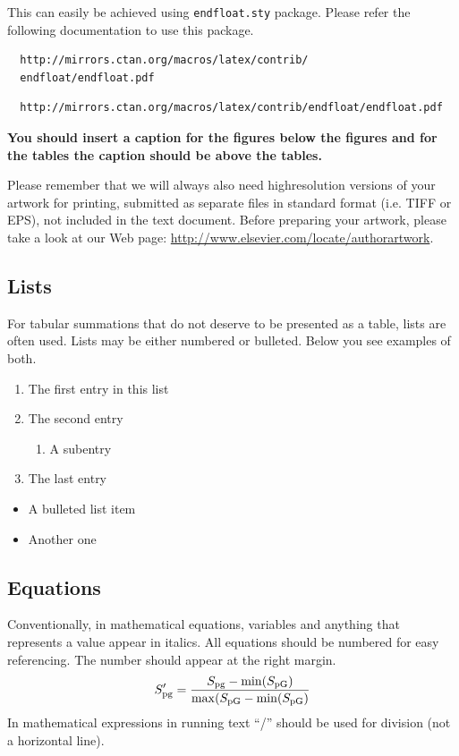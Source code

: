 \documentclass[times,twocolumn,final,authoryear]{elsarticle}
\begin{document}
This can easily be achieved using \verb+endfloat.sty+ package. Please
refer the following documentation to use this package.
\makeatletter
\if@twocolumn
\begin{verbatim}
  http://mirrors.ctan.org/macros/latex/contrib/
  endfloat/endfloat.pdf
\end{verbatim}
\else
\begin{verbatim}
  http://mirrors.ctan.org/macros/latex/contrib/endfloat/endfloat.pdf
\end{verbatim}
\fi
\makeatother

\textcolor{newcolor}{\bf You should insert a caption for the figures
below the figures and for the tables the caption should be above the
tables.} 

Please remember that we will always also need highresolution versions
of your artwork for printing, submitted as separate files in standard
format (i.e. TIFF or EPS), not included in the text document. Before
preparing your artwork, please take a look at our Web page:
\url{http://www.elsevier.com/locate/authorartwork}.


\subsection{Lists}

For tabular summations that do not deserve to be presented as
a table, lists are often used. Lists may be either numbered or
bulleted. Below you see examples of both.
\begin{enumerate}
\item The first entry in this list
\item The second entry
\begin{enumerate}
\item A subentry
\end{enumerate}
\item The last entry
\end{enumerate}
\begin{itemize}
\item A bulleted list item
\item Another one
\end{itemize}

\subsection{Equations}
Conventionally, in mathematical equations, variables and
anything that represents a value appear in italics.
All equations should be numbered for easy referencing. The number
should appear at the right margin.
\begin{equation}
S_{\rm pg}'=\frac{S_{\rm pg}-\min(S_{\rm pG})}
 {\max(S_{\rm pG}-\min(S_{\rm pG})}
\end{equation}
In mathematical expressions in running text ``/'' should be used for
division (not a horizontal line). 
\end{document}
